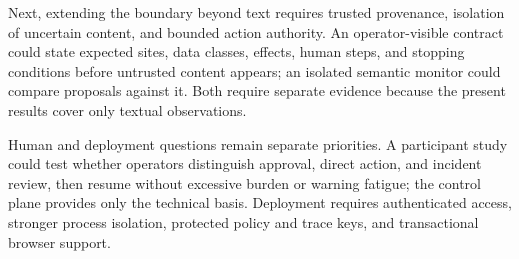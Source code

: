 Next, extending the boundary beyond text requires trusted provenance, isolation
of uncertain content, and bounded action authority. An operator-visible
contract could state expected sites, data classes, effects, human steps, and
stopping conditions before untrusted content appears; an isolated semantic
monitor could compare proposals against it. Both require separate evidence
because the present results cover only textual observations.

Human and deployment questions remain separate priorities. A participant study
could test whether operators distinguish approval, direct action, and incident
review, then resume without excessive burden or warning fatigue; the control
plane provides only the technical basis. Deployment requires authenticated
access, stronger process isolation, protected policy and trace keys, and
transactional browser support.
